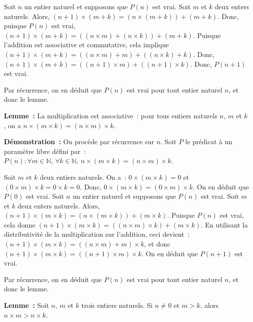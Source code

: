     Soit $n$ un entier naturel et supposons que $P(n)$ est vrai. 
    Soit $m$ et $k$ deux enters naturels. 
    Alors, $(n+1) \times (m + k) = (n \times (m + k)) + (m + k)$. 
    Donc, puisque $P(n)$ est vrai, $(n+1) \times (m + k) = ((n \times m) + (n \times k)) + (m + k)$. 
    Puisque l'addition est associative et commutative, cela implique $(n+1) \times (m + k) = ((n \times m) + m) + ((n \times k) + k)$. 
    Donc, $(n+1) \times (m + k) = ((n+1) \times m) + ((n+1) \times k)$. 
    Donc, $P(n+1)$ est vrai. 

    Par récurrence, on en déduit que $P(n)$ est vrai pour tout entier naturel $n$, et donc le lemme.

   \done 

\medskip

\noindent\textbf{Lemme :} La multiplication est associative : pour tous entiers naturels $n$, $m$ et $k$, on a $n \times (m \times k) = (n \times m) \times k$.

\medskip

\noindent\textbf{Démonstration :} On procède par récurrence sur $n$. 
    Soit $P$ le prédicat à un paramètre libre défini par : $P(n): \forall m \in \mathbb{N}, \, \forall k \in \mathbb{N}, \, n \times (m \times k) = (n \times m) \times k$.

    Soit $m$ et $k$ deux entiers naturels. 
    On a : $0 \times (m \times k) = 0$ et $(0 \times m) \times k = 0 \times k = 0$. 
    Donc, $0 \times (m \times k) = (0 \times m) \times k$. 
    On en déduit que $P(0)$ est vrai. 
    Soit $n$ un entier naturel et supposons que $P(n)$ est vrai. 
    Soit $m$ et $k$ deux enters naturels. 
    Alors, $(n+1) \times (m \times k) = (n \times (m \times k)) + (m \times k)$. 
    Puisque $P(n)$ est vrai, cela donne $(n+1) \times (m \times k) = ((n \times m) \times k) + (m \times k)$. 
    En utilisant la distributivité de la multiplication sur l'addition, ceci devient : $(n+1) \times (m \times k) = ((n \times m) + m) \times k$, et donc $(n+1) \times (m \times k) = ((n + 1) \times m) \times k$.
    On en déduit que $P(n+1)$ est vrai. 
    
    Par récurrence, on en déduit que $P(n)$ est vrai pour tout entier naturel $n$, et donc le lemme.

   \done 

\medskip

\noindent\textbf{Lemme :} Soit $n$, $m$ et $k$ trois entiers naturels. Si $n \neq 0$ et $m > k$, alors $n \times m > n \times k$.

\medskip

